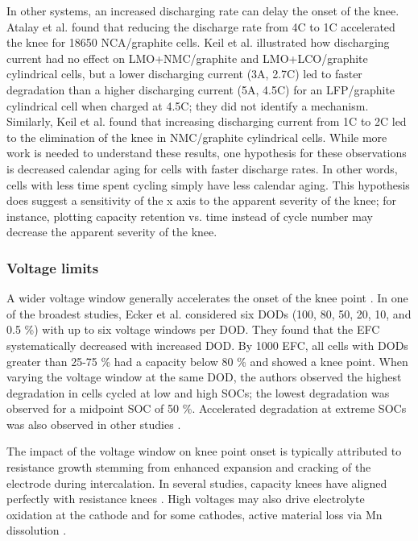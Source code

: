 \documentclass[journal=jpclcd,manuscript=article]{achemso}
\begin{document}
In other systems, an increased discharging rate can delay the onset of the knee.
Atalay et al.\cite{atalay_theory_2020} found that reducing the discharge rate from 4C to 1C accelerated the knee for 18650 NCA/graphite cells.
Keil et al.\cite{keil_charging_2016} illustrated how discharging current had no effect on LMO+NMC/graphite and LMO+LCO/graphite cylindrical cells, but a lower discharging current (3A, 2.7C) led to faster degradation than a higher discharging current (5A, 4.5C) for an LFP/graphite cylindrical cell when charged at 4.5C; they did not identify a mechanism. 
Similarly, Keil et al.\cite{keil_linear_2019} found that increasing discharging current from 1C to 2C led to the elimination of the knee in NMC/graphite cylindrical cells.
While more work is needed to understand these results, one hypothesis for these observations is decreased calendar aging for cells with faster discharge rates.
In other words, cells with less time spent cycling simply have less calendar aging. This hypothesis does suggest a sensitivity of the x axis to the apparent severity of the knee; for instance, plotting capacity retention vs. time instead of cycle number may decrease the apparent severity of the knee.

\subsubsection{Voltage limits} 
A wider voltage window generally accelerates the onset of the knee point \cite{ecker_calendar_2014, pfrang_long-term_2018, klett_non-uniform_2014, ma_novel_2019, petzl_lithium_2015, schuster_nonlinear_2015}. In one of the broadest studies, Ecker et al. \cite{ecker_calendar_2014} considered six DODs (100, 80, 50, 20, 10, and 0.5 \%) with up to six voltage windows per DOD. They found that the EFC systematically decreased with increased DOD. By 1000 EFC, all cells with DODs greater than 25-75 \% had a capacity below 80 \% and showed a knee point. When varying the voltage window at the same DOD, the authors observed the highest degradation in cells cycled at low and high SOCs; the lowest degradation was observed for a midpoint SOC of 50 \%. Accelerated degradation at extreme SOCs was also observed in other studies \cite{aiken_accelerated_2020,ma_novel_2019, zhu_investigation_2021}.

The impact of the voltage window on knee point onset is typically attributed to resistance growth stemming from enhanced expansion and cracking of the electrode during intercalation. In several studies, capacity knees have aligned perfectly with resistance knees \cite{ecker_calendar_2014, klett_non-uniform_2014, schuster_nonlinear_2015, zhu_investigation_2021}. High voltages may also drive electrolyte oxidation at the cathode \cite{aiken_accelerated_2020} and for some cathodes, active material loss via Mn dissolution \cite{ma_novel_2019}. 
\end{document}
